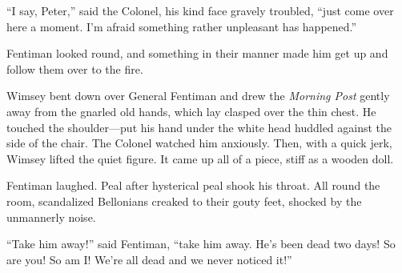 \enquote{I say, Peter,} said the Colonel, his kind face gravely troubled, \enquote{just come over here a moment. I'm afraid something rather unpleasant has happened.}

Fentiman looked round, and something in their manner made him get up and follow them over to the fire.

Wimsey bent down over General Fentiman and drew the \textit{Morning Post} gently away from the gnarled old hands, which lay clasped over the thin chest. He touched the shoulder\allowbreak---\allowbreak put his hand under the white head huddled against the side of the chair. The Colonel watched him anxiously. Then, with a quick jerk, Wimsey lifted the quiet figure. It came up all of a piece, stiff as a wooden doll.

Fentiman laughed. Peal after hysterical peal shook his throat. All round the room, scandalized Bellonians creaked to their gouty feet, shocked by the unmannerly noise.

\enquote{Take him away!} said Fentiman, \enquote{take him away. He's been dead two days! So are you! So am I! We're all dead and we never noticed it!}